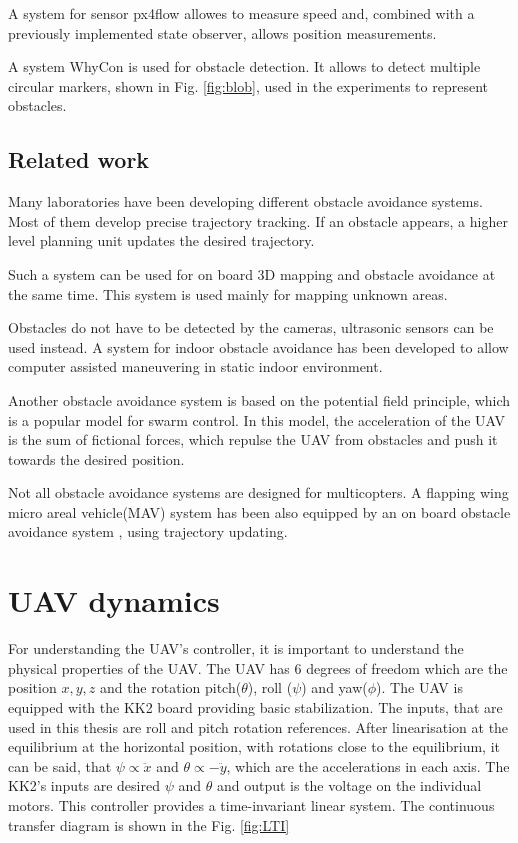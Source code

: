 \documentclass[a4paper,11pt,titlepage]{article}
\begin{document}
A system for sensor px4flow \cite{endrych2014} allowes to measure speed and, combined with a previously implemented state observer\cite{tomas}, allows position measurements. 

A system WhyCon\cite{whycon_icar}\cite{whycon_jint} is used for obstacle detection. It allows to detect multiple circular markers, shown in Fig. \ref{fig:blob}, used in the experiments to represent obstacles.

\subsection{Related work}
Many laboratories have been developing different obstacle avoidance systems. Most of them develop precise trajectory tracking. If an obstacle appears, a higher level planning unit updates the desired trajectory.

Such a system can be used for on board 3D mapping and obstacle avoidance\cite{weiss2011intuitive} at the same time. This system is used mainly for mapping unknown areas.

Obstacles do not have to be detected by the cameras, ultrasonic sensors can be used instead. A system for indoor obstacle avoidance\cite{gupta2015obstacle} has been developed to allow computer assisted maneuvering in static indoor environment. 

Another obstacle avoidance system is based on the potential field principle, which is a popular model for swarm control\cite{budiyanto2015uav}. In this model, the acceleration of the UAV is the sum of fictional forces, which repulse the UAV from obstacles and push it	 towards the desired position.

Not all obstacle avoidance systems are designed for multicopters. A flapping wing micro areal vehicle(MAV) system has been also equipped by an on board obstacle avoidance system \cite{tijmons2016obstacle}, using trajectory updating.


\section{UAV dynamics}
For understanding the UAV's controller, it is important to understand the physical properties of the UAV. The UAV has 6 degrees of freedom which are the position $x, y, z$ and the rotation pitch($\theta$), roll ($\psi$) and yaw($\phi$). The UAV is equipped with the KK2 board providing basic stabilization. The inputs, that are used in this thesis are roll and pitch rotation references. After linearisation at the equilibrium at the horizontal position, with rotations close to the equilibrium, it can be said, that $\psi \propto \ddot{x}$ and $\theta \propto -\ddot{y}$, which are the accelerations in each axis. The KK2's inputs are desired $\psi$ and $\theta$ and output is the voltage on the individual motors. This controller provides a time-invariant linear system. The continuous transfer diagram is shown in the Fig. \ref{fig:LTI}
\end{document}
